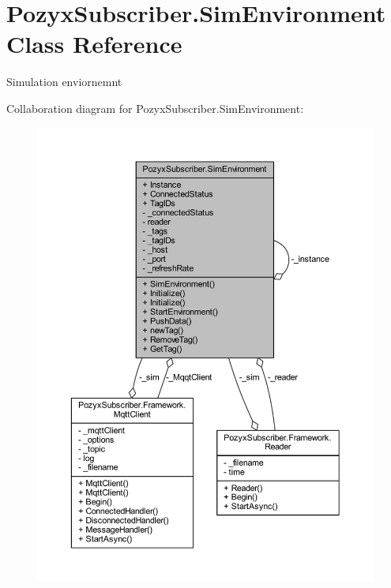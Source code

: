 \hypertarget{class_pozyx_subscriber_1_1_sim_environment}{}\section{Pozyx\+Subscriber.\+Sim\+Environment Class Reference}
\label{class_pozyx_subscriber_1_1_sim_environment}


Simulation enviornemnt  




Collaboration diagram for Pozyx\+Subscriber.\+Sim\+Environment\+:
\nopagebreak
\begin{figure}[H]
\begin{center}
\leavevmode
\includegraphics[width=350pt]{class_pozyx_subscriber_1_1_sim_environment__coll__graph}
\end{center}
\end{figure}
